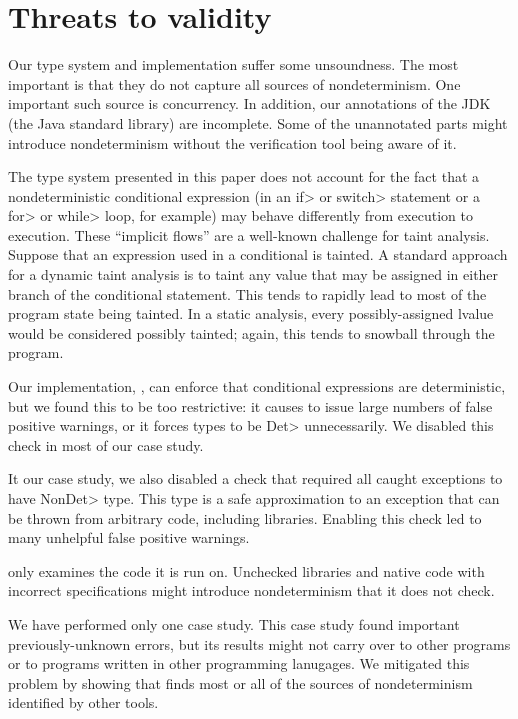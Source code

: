 \section{Threats to validity}\label{sec:threats}

Our type system and implementation suffer some unsoundness.  The most
important is that they do not capture all sources of nondeterminism.  One
important such source is concurrency.
%
In addition, our annotations of the JDK (the Java standard library) are incomplete.
Some of the unannotated parts might introduce nondeterminism without
the verification tool being aware of it.

The type system presented in this paper does not account for the fact that
a nondeterministic conditional expression (in an \<if> or \<switch>
statement or a \<for> or \<while> loop, for example) may behave differently
from execution to execution.
These ``implicit flows'' are a well-known challenge for taint analysis.
Suppose that an expression used in a conditional is tainted.
A standard approach
\cite{Kang2011DTADT,Arzt:2014:FPC:2594291.2594299}
 for a dynamic taint analysis is to taint any value that may
be assigned in either branch of the conditional statement.  This tends to rapidly lead to most of
the program state being tainted.
In a static analysis, every possibly-assigned lvalue would be considered
possibly tainted; again, this tends to snowball through the program.

Our implementation, \theDeterminismChecker, can enforce that conditional
expressions are deterministic, but we found this to be too restrictive:  it
causes \theDeterminismChecker to issue large numbers of false positive
warnings, or it forces types to be \<Det> unnecessarily.
We disabled this check in most of our case study.

It our case study, we also disabled a check that required all caught
exceptions to have \<NonDet> type.  This type is a safe approximation to an
exception that can be thrown from arbitrary code, including libraries.
Enabling this check led to many unhelpful false positive warnings.


\TheDeterminismChecker only examines the code it is run on.  Unchecked
libraries and native code with incorrect specifications might introduce
nondeterminism that it does not check.


We have performed only one case study.  This case study found important
previously-unknown errors, but its results might not carry over to other
programs or to programs written in other programming lanugages.  We
mitigated this problem by showing that \theDeterminismChecker finds most or
all of the sources of nondeterminism identified by other tools.
